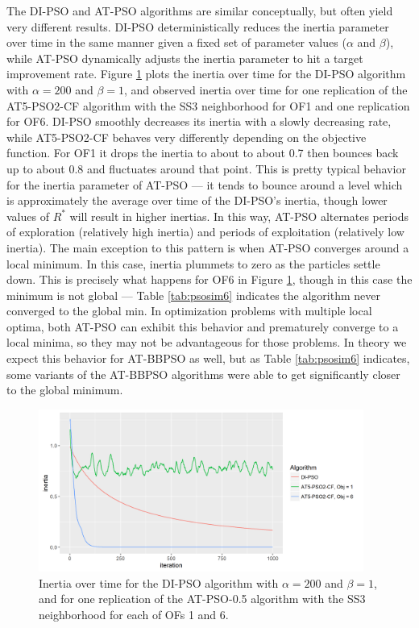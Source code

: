 \documentclass[cmbright]{staauth}
\begin{document}
The DI-PSO and AT-PSO algorithms are similar conceptually, but often yield very different results. DI-PSO deterministically reduces the inertia parameter over time in the same manner given a fixed set of parameter values ($\alpha$ and $\beta$), while AT-PSO dynamically adjusts the inertia parameter to hit a target improvement rate. Figure \ref{fig:inertia} plots the inertia over time for the DI-PSO algorithm with $\alpha=200$ and $\beta=1$, and observed inertia over time for one replication of the AT5-PSO2-CF algorithm with the SS3 neighborhood for OF1 and one replication for OF6. DI-PSO smoothly decreases its inertia with a slowly decreasing rate, while AT5-PSO2-CF behaves very differently depending on the objective function. For OF1 it drops the inertia to about to about 0.7 then bounces back up to about 0.8 and fluctuates around that point. This is pretty typical behavior for the inertia parameter of AT-PSO --- it tends to bounce around a level which is approximately the average over time of the DI-PSO's inertia, though lower values of $R^*$ will result in higher inertias. In this way, AT-PSO alternates periods of exploration (relatively high inertia) and periods of exploitation (relatively low inertia). The main exception to this pattern is when AT-PSO converges around a local minimum. In this case, inertia plummets to zero as the particles settle down. This is precisely what happens for OF6 in Figure \ref{fig:inertia}, though in this case the minimum is not global --- Table \ref{tab:psosim6} indicates the algorithm never converged to the global min. In optimization problems with multiple local optima, both AT-PSO can exhibit this behavior and prematurely converge to a local minima, so they may not be advantageous for those problems. In theory we expect this behavior for AT-BBPSO as well, but as Table \ref{tab:psosim6} indicates, some variants of the AT-BBPSO algorithms were able to get significantly closer to the global minimum.

\begin{figure}[!ht]
\centering
\includegraphics[width=0.95\textwidth]{../code/psosims/inertiaplot.png}
\caption{Inertia over time for the DI-PSO algorithm with $\alpha=200$ and $\beta=1$, and for one replication of the AT-PSO-0.5 algorithm with the SS3 neighborhood for each of OFs 1 and 6.}
\label{fig:inertia}
\end{figure}
\end{document}
